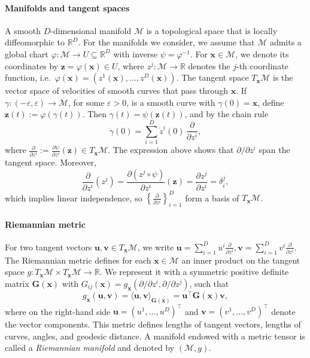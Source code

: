 \paragraph{Manifolds and tangent spaces}
A smooth $D$-dimensional manifold $\mathcal{M}$ is a topological space that is
locally diffeomorphic to $\mathbb{R}^D$. For the manifolds we consider, we assume that
$\mathcal{M}$ admits a global chart $\varphi:\mathcal{M}\to U\subseteq\mathbb{R}^D$
with inverse $\psi=\varphi^{-1}$. For $\boldsymbol{x} \in \mathcal{M}$, we denote its coordinates by
$\boldsymbol{z} =  \varphi(\boldsymbol{x}) \in U$, where $z^j:\mathcal{M}\to\mathbb{R}$
denotes the $j$-th coordinate function, i.e.\ $\varphi(\boldsymbol{x}) = (z^1(\boldsymbol{x}),\dots,z^D(\boldsymbol{x}))$.
The tangent space $T_{\boldsymbol{x}}\mathcal{M}$ is the vector space of velocities
of smooth curves that pass through $\boldsymbol{x}$. If
$\gamma:(-\varepsilon,\varepsilon)\to \mathcal{M}$, for some $\varepsilon>0$, is a smooth curve with
$\gamma(0)=\boldsymbol{x}$, define $\boldsymbol z(t):=\varphi(\gamma(t))$. Then
$\gamma(t)=\psi(\boldsymbol z(t))$, and by the chain rule
\[
\dot\gamma(0)
=
\sum_{i=1}^D \dot z^i(0)\,
\frac{\partial}{\partial z^i},
\]
where $\frac{\partial}{\partial z^i}
:=
\frac{\partial \psi}{\partial z^i}(\boldsymbol z)
\in T_{\boldsymbol x}\mathcal M$. The expression above shows that $\partial/\partial z^i$ span the tangent space. Moreover,
\[
\frac{\partial}{\partial z^i}(z^j)
=\frac{\partial (z^j\circ \psi)  }{\partial z^i} (\boldsymbol{z})
=\frac{\partial z^j  }{\partial z^i} 
=\delta_i^j,
\]
which implies linear independence, so $\left\{\frac{\partial}{\partial z^i}\right\}_{i=1}^D$ form a basis of $T_{\boldsymbol x}\mathcal M$.


\paragraph{Riemannian metric}
For two tangent vectors  $\boldsymbol{u},\boldsymbol{v}\in T_{\boldsymbol{x}}\mathcal{M}$, we write $\boldsymbol{u}=\sum_{i=1}^D u^i \frac{\partial}{\partial z^i},
\boldsymbol{v}=\sum_{i=1}^D v^i \frac{\partial}{\partial z^i}$.
The Riemannian metric defines for each $\boldsymbol{x}\in\mathcal{M}$ an inner product on the tangent space $g:T_{\boldsymbol{x}}\mathcal{M} \times T_{\boldsymbol{x}}\mathcal{M} \to \mathbb{R}$.
We represent it with a symmetric positive definite matrix $\mathbf{G}(\boldsymbol{x})$ 
with $G_{ij}(\boldsymbol{x}) = g_{\boldsymbol{x}}(\partial/\partial z^i,\partial/\partial z^j)$,
such that 
\begin{equation*}
g_{\boldsymbol{x}}(\boldsymbol{u}, \boldsymbol{v}) = 
\langle \boldsymbol{u},\boldsymbol{v}\rangle_{\mathbf{G}(\boldsymbol{x})}
=
\boldsymbol{u}^\top \mathbf{G}(\boldsymbol{x})\boldsymbol{v},
\end{equation*}
where on the right-hand side $\boldsymbol{u}=(u^1,\dots,u^D)^\top$ and
$\boldsymbol{v}=(v^1,\dots,v^D)^\top$ denote the vector components. 
This metric defines lengths of tangent vectors, lengths of curves, angles, and geodesic distance. A manifold endowed with a metric tensor is called a \emph{Riemannian manifold} and denoted by $(\mathcal{M}, g)$.


